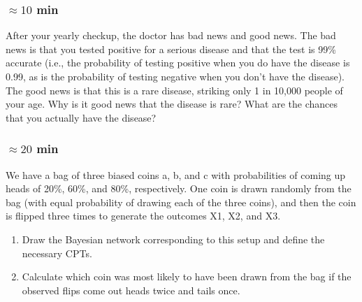 \documentclass[a4paper, 10pt]{article}
\begin{document}
    \subsubsection{$\approx 10$ min}
    After your yearly checkup, the doctor has bad news and good news. The bad news
is that you tested positive for a serious disease and that the test is 99\% accurate (i.e., the
probability of testing positive when you do have the disease is 0.99, as is the probability of
testing negative when you don’t have the disease). The good news is that this is a rare disease,
striking only 1 in 10,000 people of your age. Why is it good news that the disease is rare?
What are the chances that you actually have the disease?
\subsubsection{$\approx 20$ min}
We have a bag of three biased coins a, b, and c with probabilities of coming up heads
of 20\%, 60\%, and 80\%, respectively. One coin is drawn randomly from the bag (with equal
probability of drawing each of the three coins), and then the coin is flipped three times to
generate the outcomes X1, X2, and X3.
\begin{enumerate}
    \item Draw the Bayesian network corresponding to this setup and define the necessary CPTs.
    \item Calculate which coin was most likely to have been drawn from the bag if the observed
flips come out heads twice and tails once.
\end{enumerate}
\end{document}
